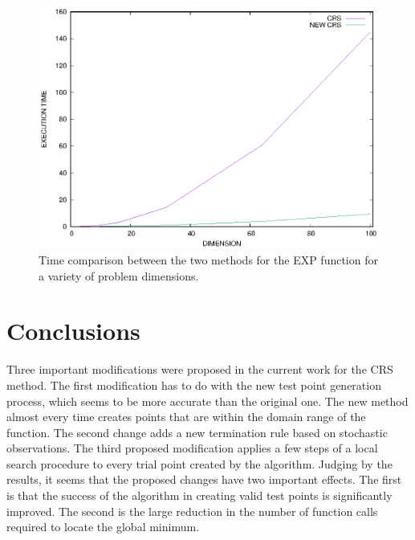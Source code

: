 \documentclass[symmetry,article,submit,moreauthors,pdftex]{mdpi}
\begin{document}
\begin{figure}
\caption{Time comparison between the two methods for the EXP function for a variety of problem dimensions.\\ \label{fig:TimeComparison}}

\begin{centering}
\includegraphics[scale=0.7]{expplot}
\par\end{centering}
\end{figure}




\section{Conclusions \label{sec:Conclusions}}

Three important modifications were proposed in the current work for
the CRS method. The first modification has to do with the new test
point generation process, which seems to be more accurate than the
original one. The new method almost every time creates points that
are within the domain range of the function. The second change adds
a new termination rule based on stochastic observations. The third
proposed modification applies a few steps of a local search procedure
to every trial point created by the algorithm. Judging by the results,
it seems that the proposed changes have two important effects. The
first is that the success of the algorithm in creating valid test
points is significantly improved. The second is the large reduction
in the number of function calls required to locate the global minimum. 
\end{document}
